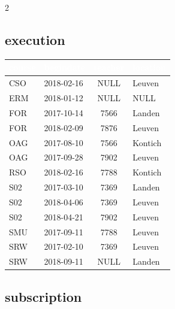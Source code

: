 \documentclass[10pt,a4paper]{article}
\newcommand{\TBLH}[1]{\textbf{\textcolor{white}{#1}}}
\begin{document}
\begin{multicols}{2}
\subsection{execution}

{\scriptsize
\begin{tabular}{|l|l|c|l|}
\hline
\rowcolor{tblhead}\TBLH{course} & \TBLH{begindate} & \TBLH{teacher} & \TBLH{location} \\ \hline
CSO & 2018-02-16 & NULL & Leuven  \\ \hline
\rowcolor{rowalt}
ERM & 2018-01-12 & NULL & NULL    \\ \hline
FOR & 2017-10-14 & 7566 & Landen  \\ \hline
\rowcolor{rowalt}
FOR & 2018-02-09 & 7876 & Leuven  \\ \hline
OAG & 2017-08-10 & 7566 & Kontich \\ \hline
\rowcolor{rowalt}
OAG & 2017-09-28 & 7902 & Leuven  \\ \hline
RSO & 2018-02-16 & 7788 & Kontich \\ \hline
\rowcolor{rowalt}
S02 & 2017-03-10 & 7369 & Landen  \\ \hline
S02 & 2018-04-06 & 7369 & Leuven  \\ \hline
\rowcolor{rowalt}
S02 & 2018-04-21 & 7902 & Leuven  \\ \hline
SMU & 2017-09-11 & 7788 & Leuven  \\ \hline
\rowcolor{rowalt}
SRW & 2017-02-10 & 7369 & Leuven  \\ \hline
SRW & 2018-09-11 & NULL & Landen  \\ \hline
\end{tabular}}

\columnbreak

\subsection{subscription}


\end{multicols}
\end{document}
